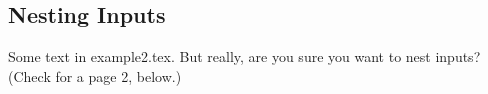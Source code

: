   \subsection{Nesting Inputs}
    Some text in example2.tex. But really, are you sure you want to nest inputs? (Check for a page 2, below.)
